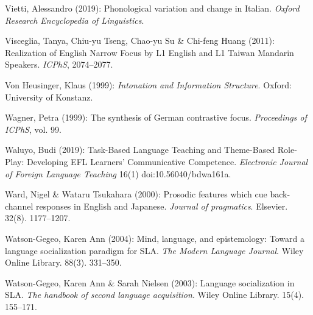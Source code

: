 \begin{styleBibliography}
Vietti, Alessandro (2019): Phonological variation and change in Italian. \textit{Oxford Research Encyclopedia of Linguistics}.
\end{styleBibliography}

\begin{styleBibliography}
Visceglia, Tanya, Chiu-yu Tseng, Chao-yu Su \& Chi-feng Huang (2011): Realization of English Narrow Focus by L1 English and L1 Taiwan Mandarin Speakers. \textit{ICPhS}, 2074–2077.
\end{styleBibliography}

\begin{styleBibliography}
Von Heusinger, Klaus (1999): \textit{Intonation and Information Structure}. Oxford: University of Konstanz.
\end{styleBibliography}

\begin{styleBibliography}
Wagner, Petra (1999): The synthesis of German contrastive focus. \textit{Proceedings of ICPhS}, vol. 99.
\end{styleBibliography}

\begin{styleBibliography}
Waluyo, Budi (2019): Task-Based Language Teaching and Theme-Based Role-Play: Developing EFL Learners’ Communicative Competence. \textit{Electronic Journal of Foreign Language Teaching} 16(1) doi:10.56040/bdwa161a.
\end{styleBibliography}

\begin{styleBibliography}
Ward, Nigel \& Wataru Tsukahara (2000): Prosodic features which cue back-channel responses in English and Japanese. \textit{Journal of pragmatics}. Elsevier. 32(8). 1177–1207.
\end{styleBibliography}

\begin{styleBibliography}
Watson-Gegeo, Karen Ann (2004): Mind, language, and epistemology: Toward a language socialization paradigm for SLA. \textit{The Modern Language Journal}. Wiley Online Library. 88(3). 331–350.
\end{styleBibliography}

\begin{styleBibliography}
Watson-Gegeo, Karen Ann \& Sarah Nielsen (2003): Language socialization in SLA. \textit{The handbook of second language acquisition}. Wiley Online Library. 15(4). 155–171.
\end{styleBibliography}

